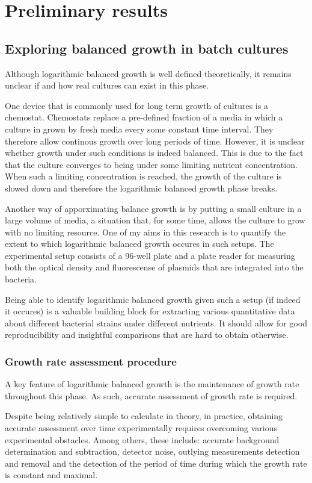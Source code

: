\documentclass{report}
\begin{document}
\section{Preliminary results}
\subsection{Exploring balanced growth in batch cultures}
Although logarithmic balanced growth is well defined theoretically, it remains unclear if and how real cultures can exist in this phase.

One device that is commonly used for long term growth of cultures is a chemostat.
Chemostats replace a pre-defined fraction of a media in which a culture in grown by fresh media every some constant time interval.
They therefore allow continous growth over long periods of time.
However, it is unclear whether growth under such conditions is indeed balanced.
This is due to the fact that the culture converges to being under some limiting nutrient concentration.
When such a limiting concentration is reached, the growth of the culture is slowed down and therefore the logarithmic balanced growth phase breaks.

Another way of apporximating balance growth is by putting a small culture in a large volume of media, a situation that, for some time, allows the culture to grow with no limiting resource.
One of my aims in this research is to quantify the extent to which logarithmic balanced growth occures in such setups.
The experimental setup consists of a 96-well plate and a plate reader for measuring both the optical density and fluorescense of plasmids that are integrated into the bacteria.

Being able to identify logarithmic balanced growth given such a setup (if indeed it occures) is a valuable building block for extracting various quantitative data about different bacterial strains under different nutrients.
It should allow for good reproducibility and insightful comparisons that are hard to obtain otherwise.
\subsubsection{Growth rate assessment procedure}
\label{growth-rate}
A key feature of logarithmic balanced growth is the maintenance of growth rate throughout this phase.
As such, accurate assessment of growth rate is required.

Despite being relatively simple to calculate in theory, in practice, obtaining accurate assessment over time experimentally requires overcoming various experimental obstacles.
Among others, these include: accurate background determination and subtraction, detector noise, outlying measurements detection and removal and the detection of the period of time during which the growth rate is constant and maximal.
\end{document}
